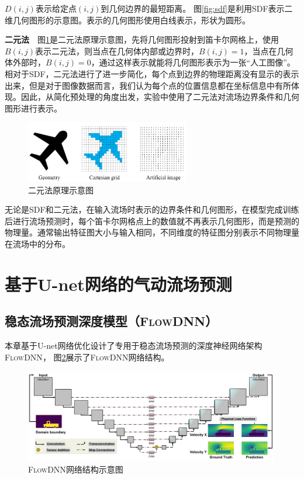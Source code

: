 $D(i, j)$表示给定点$(i, j)$到几何边界的最短距离。
图\ref{fig:sdf}是利用SDF表示二维几何图形的示意图。表示的几何图形使用白线表示，形状为圆形。


\textbf{二元法}~~图\ref{fig:binary}是二元法原理示意图，先将几何图形投射到笛卡尔网格上，使用$B(i, j)$表示二元法，则当点在几何体内部或边界时，$B(i, j) = 1$，当点在几何体外部时，$B(i, j) = 0$，通过这样表示就能将几何图形表示为一张“人工图像”。
相对于SDF，二元法进行了进一步简化，每个点到边界的物理距离没有显示的表示出来，但是对于图像数据而言，我们认为每个点的位置信息都在坐标信息中有所体现。因此，从简化预处理的角度出发，实验中使用了二元法对流场边界条件和几何图形进行表示。

\begin{figure}[htp]
	\centering
	\includegraphics[width=0.64\textwidth]{figures/binary.png}
	\caption{二元法原理示意图}
	\label{fig:binary}
\end{figure}


无论是SDF和二元法，在输入流场时表示的边界条件和几何图形，在模型完成训练后进行流场预测时，每个笛卡尔网格点上的数值就不再表示几何图形，而是预测的物理量。通常输出特征图大小与输入相同，不同维度的特征图分别表示不同物理量在流场中的分布。




\section{基于U-net网络的气动流场预测}



\subsection{稳态流场预测深度模型（\textsc{FlowDNN}）}
本章基于U-net网络优化设计了专用于稳态流场预测的深度神经网络架构\textsc{FlowDNN}，
图\ref{fig:flowdnn}展示了\textsc{FlowDNN}网络结构。


\begin{figure}[htp]
	\centering
	\includegraphics[width=0.99\textwidth]{figures/data/architecture.pdf}
	\caption{\textsc{FlowDNN}网络结构示意图}
	\label{fig:flowdnn}
\end{figure}

